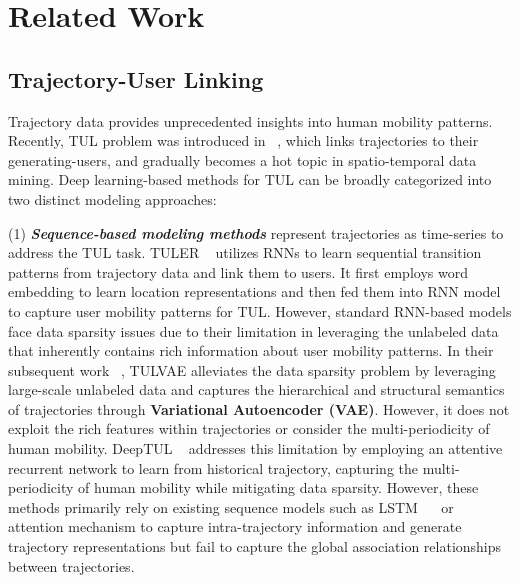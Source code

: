 \section{Related Work}
\subsection{Trajectory-User Linking}

Trajectory data provides unprecedented insights into human mobility patterns. Recently, TUL problem was introduced in ~\cite{TULER},  which links trajectories to their generating-users, and gradually becomes a hot topic in spatio-temporal data mining. Deep learning-based methods for TUL can be broadly categorized into two distinct modeling approaches:

(1) \textbf{\textit{Sequence-based modeling methods}} represent trajectories as time-series to address the TUL task. TULER ~\cite{TULER} utilizes RNNs to learn sequential transition patterns from trajectory data and link them to users. It first employs word embedding to learn location representations and then fed them into RNN model to capture user mobility patterns for TUL. However, standard RNN-based models face data sparsity issues due to their limitation in leveraging the unlabeled data that inherently contains rich information about user mobility patterns. In their subsequent work ~\cite{TULVAE}, TULVAE alleviates the data sparsity problem by leveraging large-scale unlabeled data and captures the hierarchical and structural semantics of trajectories through \textbf{Variational Autoencoder (VAE)}. However, it does not exploit the rich features within trajectories or consider the multi-periodicity of human mobility. DeepTUL ~\cite{deeptul} addresses this limitation by employing an attentive recurrent network to learn from historical trajectory, capturing the multi-periodicity of human mobility while mitigating data sparsity. However, these methods primarily rely on existing sequence models such as LSTM ~\cite{TULER}~\cite{TULVAE} or attention mechanism \cite{deeptul} to capture intra-trajectory information and generate trajectory representations but fail to capture the global association relationships between trajectories.

